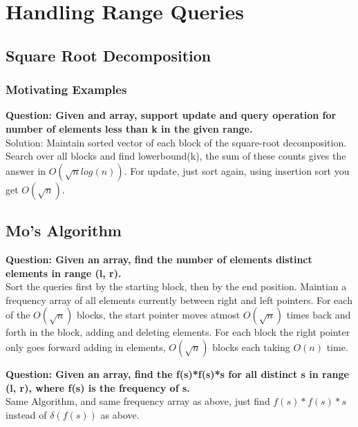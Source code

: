 \chapter{Handling Range Queries}



\section{Square Root Decomposition}


\subsection{Motivating Examples}

\begin{example}{}
    \textbf{Question: Given and array, support update and query operation for number of elements less than k in the given range.} \\
    Solution: Maintain sorted vector of each block of the square-root decomposition. Search over all blocks and find lowerbound(k), the sum of these counts gives the answer in $O(\sqrt{n} log(n))$. For update, just sort again, using insertion sort you get $O(\sqrt{n})$.
\end{example}



\section{Mo's Algorithm}

\begin{example}{}
    \textbf{Question: Given an array, find the number of elements distinct elements in range (l, r).} \\
    Sort the queries first by the starting block, then by the end position. Maintian a frequency array of all elements currently between right and left pointers. For each of the $O(\sqrt{n})$ blocks, the start pointer moves atmost $O(\sqrt{n})$ times back and forth in the block, adding and deleting elements. For each block the right pointer only goes forward adding in elements, $O(\sqrt{n})$ blocks each taking $O(n)$ time.
\end{example}

\begin{example}{}
    \textbf{Question: Given an array, find the f(s)*f(s)*s for all distinct s in range (l, r), where f(s) is the frequency of s.} \\
    Same Algorithm, and same frequency array as above, just find $f(s)*f(s)*s$ instead of $\delta(f(s))$ as above.
\end{example}
